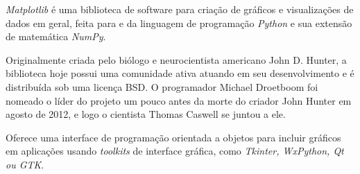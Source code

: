 \textit{Matplotlib} é uma biblioteca de software para criação de gráficos e visualizações de dados em geral, feita para e da linguagem de programação \textit{Python} e sua extensão de matemática \textit{NumPy}.

Originalmente criada pelo biólogo e neurocientista americano John D. Hunter, a biblioteca hoje possui uma comunidade ativa atuando em seu desenvolvimento e é distribuída sob uma licença BSD. O programador Michael Droetboom foi nomeado o líder do projeto um pouco antes da morte do criador John Hunter em agosto de 2012, e logo o cientista Thomas Caswell se juntou a ele.

Oferece uma interface de programação orientada a objetos para incluir gráficos em aplicações usando \textit{toolkits} de interface gráfica, como \textit{Tkinter, WxPython, Qt ou GTK}.